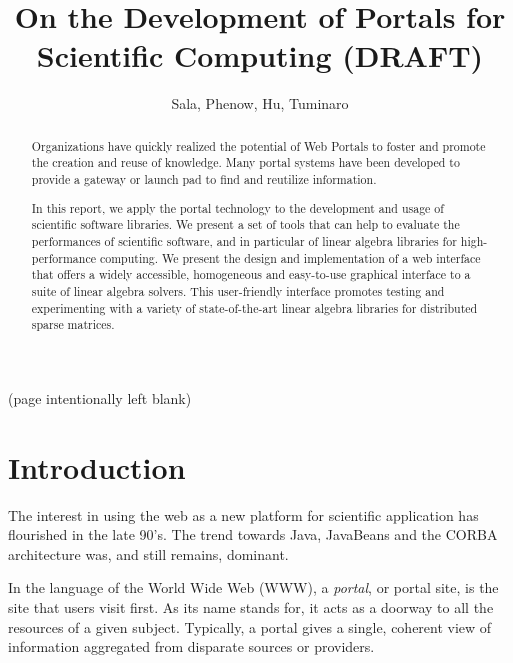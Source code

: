 \documentclass[11pt,relax]{SANDreport}
\author{Sala, Phenow, Hu, Tuminaro}
\title{On the Development of Portals for Scientific Computing (DRAFT)}
\begin{document}
\maketitle

\begin{abstract}
Organizations have quickly realized the potential of Web Portals to foster and
promote the creation and reuse of knowledge. Many portal systems have been
developed to provide a gateway or launch pad to find and reutilize
information.

In this report, we apply the portal technology to the development and usage of
scientific software libraries.  We present a set of tools that can help to
evaluate the performances of scientific software, and in particular of linear
algebra libraries for high-performance computing. We present the design and
implementation of a  web interface that offers a widely accessible,
               homogeneous and easy-to-use graphical interface to a suite of
               linear algebra solvers.  This user-friendly interface promotes
               testing and experimenting with a variety of state-of-the-art
               linear algebra libraries for distributed sparse matrices.
\end{abstract}

\clearpage
\begin{center}
(page intentionally left blank)
\end{center}

\SANDmain

\tableofcontents

\clearpage
\newpage


\section{Introduction}

The interest in using the web as a new platform for scientific application has
flourished in the late 90's. The trend towards Java, JavaBeans
and the CORBA architecture was, and still remains, dominant. 

In the language of the World Wide Web (WWW), a {\sl portal}, or portal site,
is the site that users visit first. As its name stands for, it acts as a
doorway to all the resources of a given subject. Typically, a portal gives a
single, coherent view of information aggregated from disparate sources or
providers. 
\end{document}
